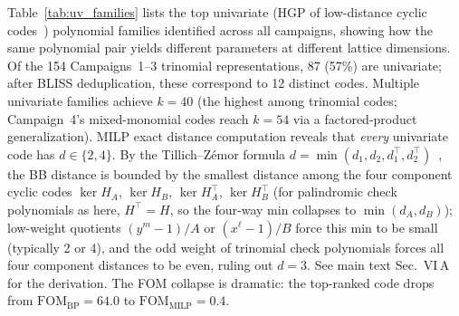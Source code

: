 \documentclass[aps,prxquantum,twocolumn,superscriptaddress,nofootinbib]{revtex4-2}
\newcommand{\FOM}{\ensuremath{\mathrm{FOM}}}
\begin{document}
Table~\ref{tab:uv_families} lists the top univariate (HGP of low-distance cyclic codes~\cite{eberhardt2024pruning}) polynomial families identified across all campaigns, showing how the same polynomial pair yields different parameters at different lattice dimensions.
Of the 154 Campaigns~1--3 trinomial representations, 87 (57\%) are univariate; after BLISS deduplication, these correspond to 12 distinct codes.
Multiple univariate families achieve $k = 40$ (the highest among trinomial codes; Campaign~4's mixed-monomial codes reach $k = 54$ via a factored-product generalization).
MILP exact distance computation reveals that \emph{every} univariate code has $d \in \{2, 4\}$.
By the Tillich--Z\'emor formula $d = \min(d_1, d_2, d_1^\top, d_2^\top)$~\cite{tillich2014quantum}, the BB distance is bounded by the smallest distance among the four component cyclic codes $\ker H_A$, $\ker H_B$, $\ker H_A^\top$, $\ker H_B^\top$ (for palindromic check polynomials as here, $H^\top = H$, so the four-way min collapses to $\min(d_A, d_B)$); low-weight quotients $(y^m{-}1)/A$ or $(x^\ell{-}1)/B$ force this min to be small (typically 2 or 4), and the odd weight of trinomial check polynomials forces all four component distances to be even, ruling out $d = 3$.
See main text Sec.~VI\,A for the derivation.
The FOM collapse is dramatic: the top-ranked code drops from $\FOM_{\text{BP}} = 64.0$ to $\FOM_{\text{MILP}} = 0.4$.
\end{document}
